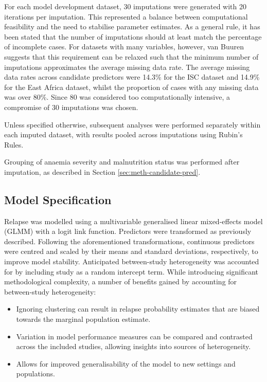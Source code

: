 For each model development dataset, 30 imputations were generated with 20 iterations per imputation. This represented a balance between computational feasibility and the need to stabilise parameter estimates. As a general rule, it has been stated that the number of imputations should at least match the percentage of incomplete cases\cite{white2011}. For datasets with many variables, however, van Buuren suggests that this requirement can be relaxed such that the minimum number of imputations approximates the average missing data rate\cite{van-buuren2011}. The average missing data rates across candidate predictors were 14.3\% for the ISC dataset and 14.9\% for the East Africa dataset, whilst the proportion of cases with any missing data was over 80\%. Since 80  was considered too computationally intensive, a compromise of 30 imputations was chosen.

Unless specified otherwise, subsequent analyses were performed separately within each imputed dataset, with results pooled across imputations using Rubin's Rules\cite{rubin1987}.

Grouping of anaemia severity and malnutrition status was performed after imputation, as described in Section \ref{sec:meth-candidate-pred}.

\subsection{\label{sec:meth-ms}Model Specification}

Relapse was modelled using a multivariable generalised linear mixed-effects model (GLMM) with a logit link function. Predictors were transformed as previously described. Following the aforementioned transformations, continuous predictors were centred and scaled by their means and standard deviations, respectively, to improve model stability. Anticipated between-study heterogeneity was accounted for by including study as a random intercept term\cite{bouwmeester2013A}. While introducing significant methodological complexity, a number of benefits gained by accounting for between-study heterogeneity\cite{debray2023}:

\begin{itemize}
  \item Ignoring clustering can result in relapse probability estimates that are biased towards the marginal population estimate\cite{wynants2018}.
  \item Variation in model performance measures can be compared and contrasted across the included studies, allowing insights into sources of heterogeneity\cite{steyerberg2019}.
  \item Allows for improved generalisability of the model to new settings and populations\cite{debray2023,steyerberg2019}.
\end{itemize}

